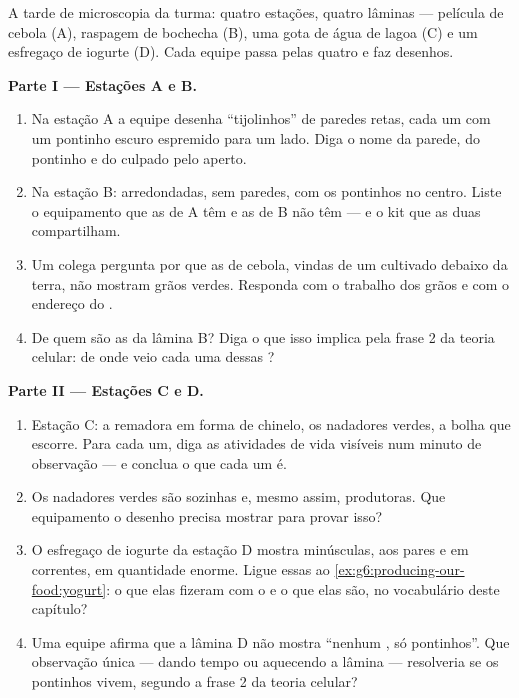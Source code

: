 \begin{problem}\label{pb:g6:cell-unit-of-life:1}
A tarde de microscopia da turma: quatro estações, quatro lâminas ---
película de cebola (A), raspagem de bochecha (B), uma gota de água de
lagoa (C) e um esfregaço de iogurte (D). Cada equipe passa pelas
quatro e faz desenhos.

\medskip\noindent\textbf{Parte I --- Estações A e B.}
\begin{enumerate}
  \item Na estação A a equipe desenha ``tijolinhos'' de paredes
        retas, cada um com um pontinho escuro espremido para um lado.
        Diga o nome da parede, do pontinho e do culpado pelo aperto.
  \item Na estação B:  arredondadas, sem paredes, com os
        pontinhos no centro. Liste o equipamento que as  de A
        têm e as de B não têm --- e o kit que as duas compartilham.
  \item Um colega pergunta por que as  de cebola, vindas de um
         cultivado debaixo da terra, não mostram grãos verdes.
        Responda com o trabalho dos grãos e com o endereço do .
  \item De quem são as  da lâmina B? Diga o que isso implica
        pela frase 2 da teoria celular: de onde veio cada uma dessas
        ?
\end{enumerate}

\medskip\noindent\textbf{Parte II --- Estações C e D.}
\begin{enumerate}[resume]
  \item Estação C: a remadora em forma de chinelo, os nadadores
        verdes, a bolha que escorre. Para cada um, diga as atividades
        de vida visíveis num minuto de observação --- e conclua o que
        cada um é.
  \item Os nadadores verdes são  sozinhas e, mesmo assim,
        produtoras. Que equipamento o desenho precisa mostrar para
        provar isso?
  \item O esfregaço de iogurte da estação D mostra 
        minúsculas, aos pares e em correntes, em quantidade enorme.
        Ligue essas  ao \cref{ex:g6:producing-our-food:yogurt}:
        o que elas fizeram com o  e o que elas são, no
        vocabulário deste capítulo?
  \item Uma equipe afirma que a lâmina D não mostra ``nenhum , só pontinhos''. Que observação única --- dando tempo ou
        aquecendo a lâmina --- resolveria se os pontinhos vivem,
        segundo a frase 2 da teoria celular?
\end{enumerate}


\end{problem}
